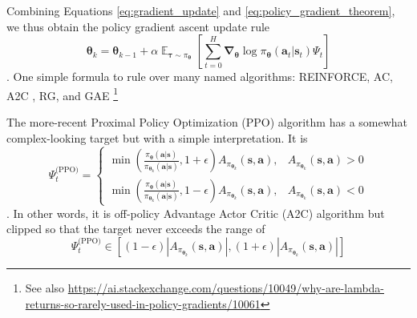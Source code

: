 \documentclass{article}
\begin{document}
Combining Equations \ref{eq:gradient_update} and \ref{eq:policy_gradient_theorem}, we thus obtain the policy gradient ascent update rule
\begin{equation}\label{eq:policty_gradient_update}
\boldsymbol{\theta}_{k}=\boldsymbol{\theta}_{k-1}+\alpha \mathop{\mathbb{E}}_{\boldsymbol{\tau}\sim\pi_{\boldsymbol{\theta}}}\left[\sum_{t=0}^H\boldsymbol{\nabla}_{\boldsymbol{\theta}}\log\pi_{\boldsymbol{\theta}}(\mathbf{a}_t|\mathbf{s}_t)\Psi_t\right]
\end{equation}. One simple formula to rule over many named algorithms: REINFORCE\cite{REINFORCE}, AC\cite{AC}, A2C \cite{A3C}, RG, and  GAE \cite{GAE}\footnote{See also \url{https://ai.stackexchange.com/questions/10049/why-are-lambda-returns-so-rarely-used-in-policy-gradients/10061}}


The more-recent Proximal Policy Optimization (PPO) algorithm\cite{ppo} has a somewhat complex-looking target but with a simple interpretation. It is \begin{equation}\Psi_t^\text{(PPO)}=\begin{cases}\min\left(\frac{\pi_{\boldsymbol{\theta}}(\mathbf{a}|\mathbf{s})}{\pi_{\boldsymbol{\theta}_k}(\mathbf{a}|\mathbf{s})},1+\epsilon\right)A_{\pi_{\boldsymbol{\theta}_k}}(\mathbf{s},\mathbf{a}), &A_{\pi_{\boldsymbol{\theta}_k}}(\mathbf{s},\mathbf{a})>0\\\min\left(\frac{\pi_{\boldsymbol{\theta}}(\mathbf{a}|\mathbf{s})}{\pi_{\boldsymbol{\theta}_k}(\mathbf{a}|\mathbf{s})},1-\epsilon\right)A_{\pi_{\boldsymbol{\theta}_k}}(\mathbf{s},\mathbf{a}), &A_{\pi_{\boldsymbol{\theta}_k}}(\mathbf{s},\mathbf{a})<0\end{cases}\end{equation}. In other words, it is off-policy Advantage Actor Critic (A2C) algorithm but clipped so that the target never exceeds the range of \begin{equation}\Psi_t^\text{(PPO)}\in\left[(1-\epsilon)\left|A_{\pi_{\boldsymbol{\theta}_k}}(\mathbf{s},\mathbf{a})\right|,(1+\epsilon)\left|A_{\pi_{\boldsymbol{\theta}_k}}(\mathbf{s},\mathbf{a})\right|\right] \end{equation}
\end{document}
